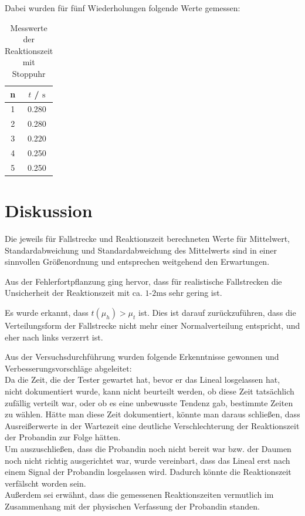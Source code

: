 \documentclass[a4paper,12pt]{article}
\begin{document}
Dabei wurden für fünf Wiederholungen folgende Werte gemessen:

\begin{table}[H]
    \centering
    \label{Tab:StoppuhrVersuch}
    \begin{tabular}{|c|c|}
        \hline
        n & $t$ / $\mathrm{s}$ \\
        \hline
        1 & 0.280 \\
        2 & 0.280 \\
        3 & 0.220 \\
        4 & 0.250 \\
        5 & 0.250 \\
        \hline
    \end{tabular}
    \caption{Messwerte der Reaktionszeit mit Stoppuhr}
\end{table}


\section{Diskussion}

Die jeweils für Fallstrecke und Reaktionszeit berechneten Werte für Mittelwert, Standardabweichung und
Standardabweichung des Mittelwerts sind in einer sinnvollen Größenordnung und entsprechen weitgehend den Erwartungen.

Aus der Fehlerfortpflanzung ging hervor, dass für realistische Fallstrecken die Unsicherheit der Reaktionszeit
mit ca. $1$-$2\mathrm{ms}$ sehr gering ist.

Es wurde erkannt, dass $t(\mu_h)>\mu_t$ ist. Dies ist darauf zurückzuführen, dass die Verteilungsform
der Fallstrecke nicht mehr einer Normalverteilung entspricht, und eher nach links verzerrt ist.

Aus der Versuchsdurchführung wurden folgende Erkenntnisse gewonnen und Verbesserungsvorschläge abgeleitet:\\
Da die Zeit, die der Tester gewartet hat, bevor er das Lineal losgelassen hat, nicht dokumentiert wurde, 
kann nicht beurteilt werden, ob diese Zeit tatsächlich zufällig verteilt war, oder ob es eine unbewusste
Tendenz gab, bestimmte Zeiten zu wählen. Hätte man diese Zeit dokumentiert, könnte man daraus 
schließen, dass Ausreißerwerte in der Wartezeit eine deutliche Verschlechterung der Reaktionszeit der
Probandin zur Folge hätten.\\
Um auszuschließen, dass die Probandin noch nicht bereit war bzw. der Daumen noch nicht richtig ausgerichtet war,
wurde vereinbart, dass das Lineal erst nach einem Signal der Probandin losgelassen wird. Dadurch könnte die
Reaktionszeit verfälscht worden sein.\\
Außerdem sei erwähnt, dass die gemessenen Reaktionszeiten vermutlich im Zusammenhang mit der physischen
Verfassung der Probandin standen.
\end{document}
